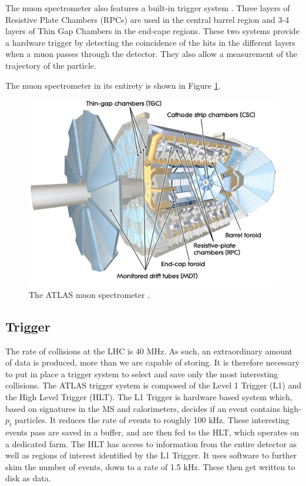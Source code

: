\documentclass[10pt,a4paper]{book}
\begin{document}
The muon spectrometer also features a built-in trigger system . Three layers of Resistive Plate Chambers (RPCs) are used in the central barrel region and 3-4 layers of Thin Gap Chambers in the end-cape regions. These two systems provide a hardware trigger by detecting the coincidence of the hits in the different layers when a muon passes through the detector. They also allow a measurement of the trajectory of the particle.

The muon spectrometer in its entirety is shown in Figure \ref{muon}.

\begin{figure}
    \centering
    \includegraphics[width=0.7\linewidth]{atlas/muon.jpg}
    \caption{The ATLAS muon spectrometer \cite{Pequenao:1095929}.}
    \label{muon}
\end{figure}

\subsection{Trigger}
The rate of collisions at the LHC is 40 MHz. As such, an extraordinary amount of data is produced, more than we are capable of storing. It is therefore necessary to put in place a trigger system to select and save only the most interesting collisions.
The ATLAS trigger system is composed of the Level 1 Trigger (L1) and the High Level Trigger (HLT). The L1 Trigger is hardware based system which, based on signatures in the MS and calorimeters, decides if an event contains high-$p_t$ particles. It reduces the rate of events to roughly 100 kHz. These interesting events pass are saved in a buffer, and are then fed to the HLT, which operates on a dedicated farm. The HLT has access to information from the entire detector as well as regions of interest identified by the L1 Trigger. It uses software to further skim the number of events, down to a rate of 1.5 kHz. These then get written to disk as data.
\end{document}
